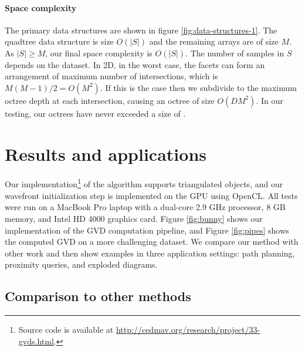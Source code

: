 \documentclass[submission]{gmp2017}
\begin{document}
\vspace{2mm}
\paragraph{Space complexity}

The primary data structures are shown in figure \ref{fig:data-structures-1}. The quadtree data structure is size $O(|S|)$ and the remaining arrays are of size $M$. As $|S| \ge M$, our final space complexity is $O(|S|)$. The number of samples in $S$ depends on the dataset. In 2D, in the worst case, the facets can form an arrangement of maximum number of intersections, which is $M(M-1)/2 = O(M^2)$. If this is the case then we subdivide to the maximum octree depth at each intersection, causing an octree of size $O(DM^2)$. In our testing, our octrees have never exceeded a size of .

\section{Results and applications}
Our implementation\footnote{Source code is available at \url{http://cedmav.org/research/project/33-gvds.html}.} of the algorithm supports  triangulated objects, and our wavefront initialization step is implemented on the GPU using OpenCL. All tests were run on a MacBook Pro laptop with a dual-core 2.9 GHz processor, 8 GB memory, and Intel HD 4000 graphics card. Figure \ref{fig:bunny} shows our implementation of the GVD computation pipeline, and Figure \ref{fig:pipes} shows the computed GVD on a more challenging dataset.  We compare our method with other work and then show examples in three application settings: path planning, proximity queries, and exploded diagrams.

\subsection{Comparison to other methods}


\end{document}
